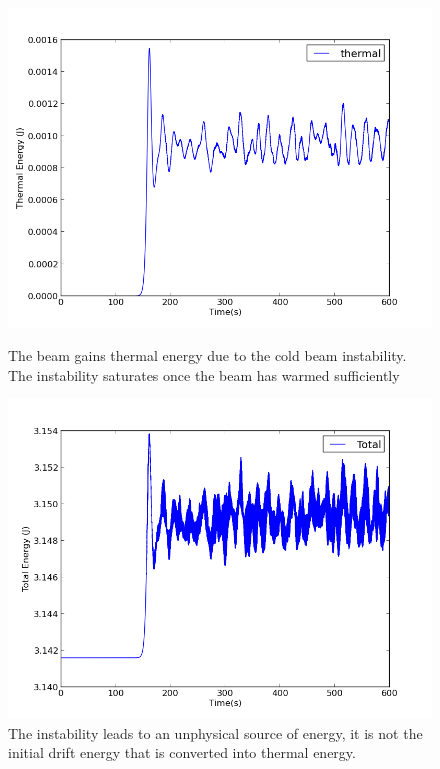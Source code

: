 \documentclass[12pt]{article}
\begin{document}
\begin{figure}[!hbt]
\vspace*{0.5cm} %
\begin{minipage}[t]{0.35\textwidth}
\includegraphics[width=\linewidth]{ThermalEnergy.png}
\caption{The beam gains thermal energy due to the cold beam instability. The instability saturates once the beam has warmed sufficiently}
\label{fig:distal}
\end{minipage}
\hspace{\fill}
\begin{minipage}[t]{0.35\textwidth}
\includegraphics[width=\linewidth]{TotalEnergy.png}
\caption{The instability leads to an unphysical source of energy, it is not the initial drift energy that is converted into thermal energy. }
\label{fig:combined}
\end{minipage}

\end{figure}
\end{document}
